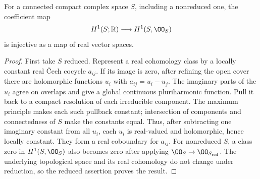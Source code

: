 \begin{proposition}\hypertarget{tag-01G5}{}\label{cdp:st:D.1.7}

For a connected compact complex space $S$, including a nonreduced
one, the coefficient map
\[
H^1(S;\mathbb R)\longrightarrow H^1(S,\OO_S)
\]
is injective as a map of real vector spaces.
\end{proposition}


\begin{proof}
First take $S$ reduced. Represent a real cohomology class by a
locally constant real \v{C}ech cocycle $a_{ij}$. If its image is zero,
after refining the open cover there are holomorphic functions $u_i$
with $a_{ij}=u_i-u_j$. The imaginary parts of the $u_i$ agree on
overlaps and give a global continuous pluriharmonic function.
Pull it back to a compact resolution of each irreducible component.
The maximum principle makes each such pullback constant; intersection
of components and connectedness of $S$ make the constants equal.
Thus, after subtracting one imaginary constant from all $u_i$,
each $u_i$ is real-valued and holomorphic, hence locally constant.
They form a real coboundary for $a_{ij}$. For nonreduced $S$, a
class zero in $H^1(S,\OO_S)$ also becomes zero after applying
$\OO_S\to\OO_{S_{\rm red}}$. The underlying topological space
and its real cohomology do not change under reduction, so the
reduced assertion proves the result.

\end{proof}
